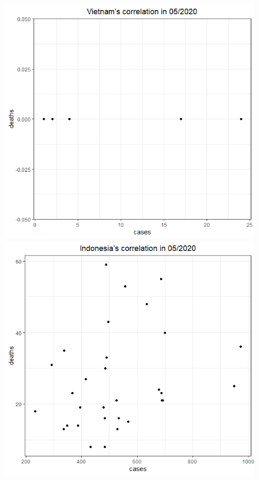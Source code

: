 \documentclass[a4paper]{article}
\theoremstyle{definition}
\begin{document}
\begin{enumerate}[1)]
\begin{figure}[H]
\begin{center}
        \includegraphics[scale = 0.3]{ix/ix.2/VN_05_2020.png}
        \includegraphics[scale = 0.3]{ix/ix.2/IDN_05_2020.png}

\end{center}
\end{figure}
\end{enumerate}
\end{document}
